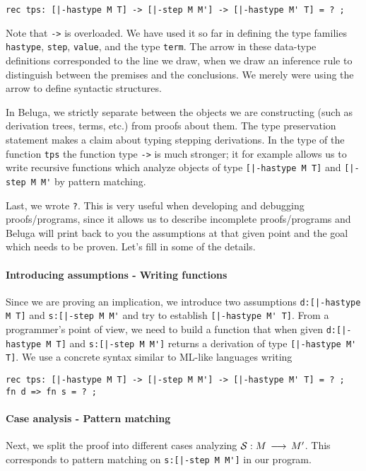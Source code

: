\begin{lstlisting}
rec tps: [|-hastype M T] -> [|-step M M'] -> [|-hastype M' T] = ? ;
\end{lstlisting}

Note that \lstinline!->! is overloaded. We have used it so far in defining
the type families \lstinline!hastype!, \lstinline!step!,
\lstinline!value!, and the type \lstinline!term!. The arrow in these
data-type definitions corresponded to the line we draw, when we draw an
inference rule to distinguish between the premises and the
conclusions. We merely were using the arrow to define syntactic
structures.

In Beluga, we strictly separate between the objects we are
constructing (such as derivation trees, terms, etc.) from proofs about
them. The type preservation statement makes a claim about typing
stepping derivations. In the type of the function \lstinline!tps! the
function type \lstinline!->! is much stronger; it for example allows us to write
recursive functions which analyze objects of type \lstinline![|-hastype M T]! and
\lstinline![|-step M M'! by pattern matching.

Last, we wrote \lstinline!?!. This is very useful when developing and
debugging proofs/programs, since it allows us to describe incomplete
proofs/programs and Beluga will print back to you the assumptions at
that given point and the goal which needs to be proven.
Let's fill in some of the details.

\paragraph{Introducing assumptions - Writing functions} Since we are proving an
implication, we introduce two assumptions \lstinline!d:[|-hastype M T]! and
\lstinline!s:[|-step M M'! and try to establish
\lstinline![|-hastype M' T]!. From a programmer's point of view, we need
to build a function that when given \lstinline!d:[|-hastype M T]! and
\lstinline!s:[|-step M M']! returns a derivation of type
\lstinline![|-hastype M' T]!. We use a concrete syntax similar to
ML-like languages writing

\begin{lstlisting}
rec tps: [|-hastype M T] -> [|-step M M'] -> [|-hastype M' T] = ? ;
fn d => fn s = ? ;
\end{lstlisting}


\paragraph{Case analysis - Pattern matching} Next, we split the proof
into different cases analyzing ${\mathcal{S}} : M \mathrel{\,\longrightarrow\,} M'$. This corresponds
to pattern matching on \lstinline!s:[|-step M M']! in our program.

